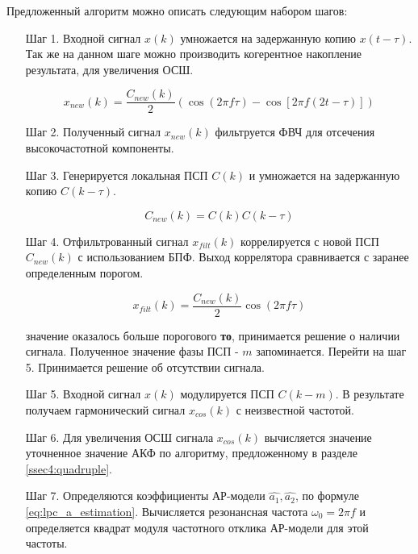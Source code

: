 Предложенный алгоритм можно описать следующим набором шагов:
\begin{itemize}
\item[Шаг 1.] Входной сигнал ${x(k)}$ умножается на задержанную копию ${x(t-\tau)}$. Так же
	на данном шаге можно производить когерентное накопление результата, для
	увеличения ОСШ.

	\begin{center}
	\begin{equation}
		x_{new}(k) = \frac{C_{new}(k)}{2} \left(\cos (2\pi f \tau) - \cos \left[2 \pi f (2t - \tau)\right]\right)
	\end{equation}
	\end{center}

\item[Шаг 2.] Полученный сигнал ${x_{new}(k)}$ фильтруется ФВЧ для отсечения высокочастотной компоненты.
\item[Шаг 3.] Генерируется локальная ПСП ${C(k)}$ и умножается на задержанную копию ${C(k-\tau)}$.

	\begin{center}
	\begin{equation}
		C_{new}(k) = C(k)C(k-\tau)
	\end{equation}
	\end{center}

\item[Шаг 4.] Отфильтрованный сигнал ${x_{filt}(k)}$ коррелируется с новой ПСП ${C_{new}(k)}$
	с использованием БПФ. Выход коррелятора сравнивается с заранее определенным порогом.

	\begin{center}
	\begin{equation}
		x_{filt}(k) = \frac{C_{new}(k)}{2} \cos (2\pi f \tau)
	\end{equation}
	\end{center}

	  значение оказалось больше порогового {\bf{то}},
		принимается решение о наличии сигнала. Полученное значение фазы ПСП  - ${m}$ запоминается.
		Перейти на шаг 5.
		Принимается решение об отсутствии сигнала.
\item[Шаг 5.] Входной сигнал ${x(k)}$ модулируется ПСП ${C(k-m)}$. В результате получаем гармонический
	сигнал ${x_{cos}(k)}$ с неизвестной частотой.
\item[Шаг 6.] Для увеличения ОСШ сигнала ${x_{cos}(k)}$ вычисляется значение уточненное значение АКФ
	по алгоритму, предложенному в разделе \ref{ssec4:quadruple}.
\item[Шаг 7.] Определяются коэффициенты АР-модели ${\hat{a_1}, \hat{a_2}}$, по формуле \ref{eq:lpc_a_estimation}. 
	Вычисляется резонансная частота ${\omega_0 = 2 \pi f}$ и определяется квадрат модуля частотного отклика АР-модели для этой частоты. 
\end{itemize}

